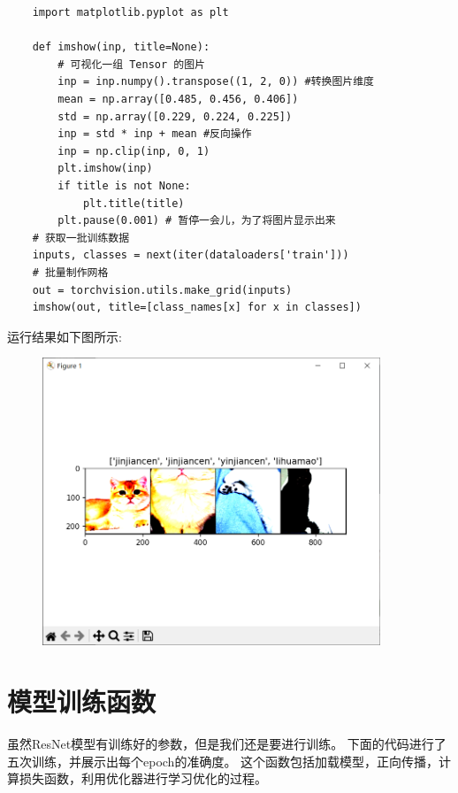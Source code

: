\documentclass[12pt, a4paper, oneside]{ctexart} %
\begin{document}
\begin{lstlisting}
    import matplotlib.pyplot as plt

    def imshow(inp, title=None): 
        # 可视化一组 Tensor 的图片
        inp = inp.numpy().transpose((1, 2, 0)) #转换图片维度
        mean = np.array([0.485, 0.456, 0.406]) 
        std = np.array([0.229, 0.224, 0.225]) 
        inp = std * inp + mean #反向操作
        inp = np.clip(inp, 0, 1) 
        plt.imshow(inp) 
        if title is not None: 
            plt.title(title) 
        plt.pause(0.001) # 暂停一会儿，为了将图片显示出来
    # 获取一批训练数据
    inputs, classes = next(iter(dataloaders['train'])) 
    # 批量制作网格
    out = torchvision.utils.make_grid(inputs) 
    imshow(out, title=[class_names[x] for x in classes]) 
\end{lstlisting}

运行结果如下图所示:

\begin{figure}[H]
    \centering
    \includegraphics[width=0.9\textwidth]{1.png}
\end{figure}


\section{模型训练函数}

虽然ResNet模型有训练好的参数，但是我们还是要进行训练。
下面的代码进行了五次训练，并展示出每个epoch的准确度。
这个函数包括加载模型，正向传播，计算损失函数，利用优化器进行学习优化的过程。
\end{document}
